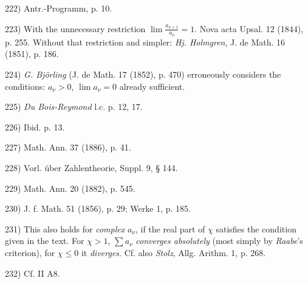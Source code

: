\vfill
\leftline{\rule{2in}{0.4pt}}
\vspace{0.2cm}
{
\footnotesize
222) Antr.-Programm, p. 10.

223) With the unnecessary restriction $\lim \frac{a_{\nu+1}}{a_\nu} = 1$. Nova acta Upsal. 12 (1844), p. 255. Without that restriction and simpler: \textit{Hj. Holmgren}, J. de Math. 16 (1851), p. 186.

224) \textit{G. Björling} (J. de Math. 17 (1852), p. 470) erroneously considers the conditions: $a_\nu > 0$, $\lim a_\nu = 0$ already sufficient.

225) \textit{Du Bois-Reymond} l.c. p. 12, 17.

226) Ibid. p. 13.

227) Math. Ann. 37 (1886), p. 41.

228) Vorl. über Zahlentheorie, Suppl. 9, § 144.

229) Math. Ann. 20 (1882), p. 545.

230) J. f. Math. 51 (1856), p. 29; Werke 1, p. 185.

231) This also holds for \textit{complex} $a_\nu$, if the real part of $\chi$ satisfies the condition given in the text. For $\chi > 1$, $\sum a_\nu$ \textit{converges absolutely} (most simply by \textit{Raabe}'s criterion), for $\chi \leq 0$ it \textit{diverges}. Cf. also \textit{Stolz}, Allg. Arithm. 1, p. 268.

232) Cf. II A8.

}